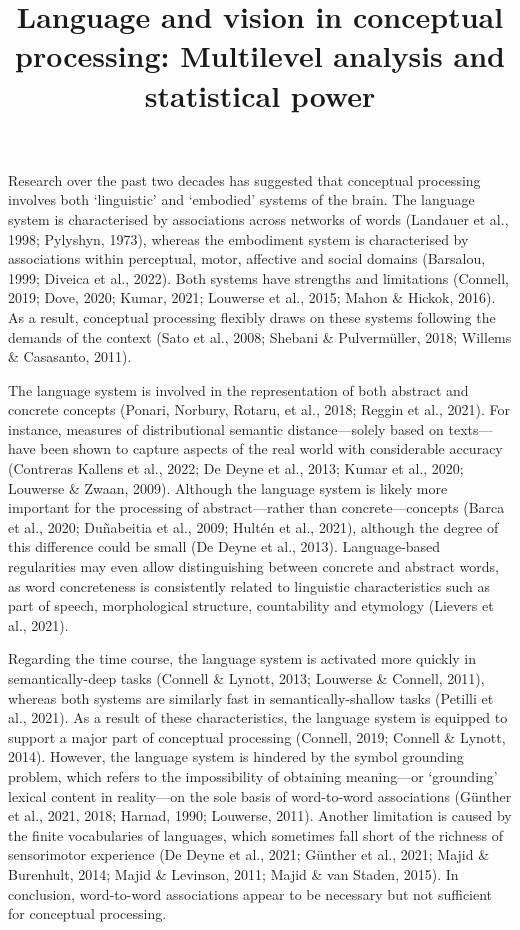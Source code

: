 \documentclass[
  12pt,
  man,floatsintext]{apa7}
\title{Language and vision in conceptual processing: Multilevel analysis and statistical power}
\author{\phantom{0}}
\date{}
\affiliation{\phantom{0}}
\begin{document}
\maketitle

\hypertarget{section}{%
\section{}\label{section}}

Research over the past two decades has suggested that conceptual processing involves both `linguistic' and `embodied' systems of the brain. The language system is characterised by associations across networks of words (Landauer et al., 1998; Pylyshyn, 1973), whereas the embodiment system is characterised by associations within perceptual, motor, affective and social domains (Barsalou, 1999; Diveica et al., 2022). Both systems have strengths and limitations (Connell, 2019; Dove, 2020; Kumar, 2021; Louwerse et al., 2015; Mahon \& Hickok, 2016). As a result, conceptual processing flexibly draws on these systems following the demands of the context (Sato et al., 2008; Shebani \& Pulvermüller, 2018; Willems \& Casasanto, 2011).

The language system is involved in the representation of both abstract and concrete concepts (Ponari, Norbury, Rotaru, et al., 2018; Reggin et al., 2021). For instance, measures of distributional semantic distance---solely based on texts---have been shown to capture aspects of the real world with considerable accuracy (Contreras Kallens et al., 2022; De Deyne et al., 2013; Kumar et al., 2020; Louwerse \& Zwaan, 2009). Although the language system is likely more important for the processing of abstract---rather than concrete---concepts (Barca et al., 2020; Duñabeitia et al., 2009; Hultén et al., 2021), although the degree of this difference could be small (De Deyne et al., 2013). Language-based regularities may even allow distinguishing between concrete and abstract words, as word concreteness is consistently related to linguistic characteristics such as part of speech, morphological structure, countability and etymology (Lievers et al., 2021).

Regarding the time course, the language system is activated more quickly in semantically-deep tasks (Connell \& Lynott, 2013; Louwerse \& Connell, 2011), whereas both systems are similarly fast in semantically-shallow tasks (Petilli et al., 2021). As a result of these characteristics, the language system is equipped to support a major part of conceptual processing (Connell, 2019; Connell \& Lynott, 2014). However, the language system is hindered by the symbol grounding problem, which refers to the impossibility of obtaining meaning---or `grounding' lexical content in reality---on the sole basis of word-to-word associations (Günther et al., 2021, 2018; Harnad, 1990; Louwerse, 2011). Another limitation is caused by the finite vocabularies of languages, which sometimes fall short of the richness of sensorimotor experience (De Deyne et al., 2021; Günther et al., 2021; Majid \& Burenhult, 2014; Majid \& Levinson, 2011; Majid \& van Staden, 2015). In conclusion, word-to-word associations appear to be necessary but not sufficient for conceptual processing.
\end{document}
